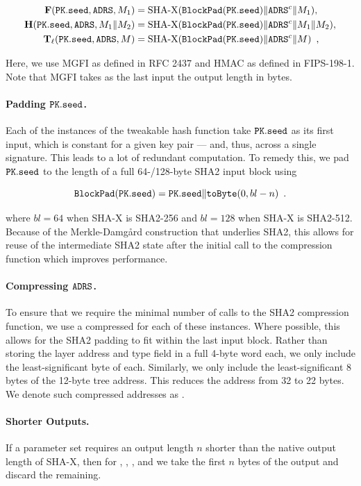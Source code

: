 \begin{align*}
    \hashF(\pk.\seed, \ADRS, M_1) &= \text{SHA-X}(\mathtt{BlockPad}(\pk.\seed) \| \ADRS^c \| M_{1} ), \\
    \hashH(\pk.\seed, \ADRS, M_1 \| M_2) &= \text{SHA-X}(\mathtt{BlockPad}(\pk.\seed) \| \ADRS^c \| M_1 \| M_2 ), \\
    \Th_\ell (\pk.\seed, \ADRS, M) &= \text{SHA-X}(\mathtt{BlockPad}(\pk.\seed) \| \ADRS^c \| M) \enspace,
\end{align*}

Here, we use MGFI as defined in RFC 2437 and HMAC as defined in FIPS-198-1. Note that MGFI takes as the last input the output length in bytes.
 

\paragraph{Padding $\pk.\seed$.} 
Each of the instances of the tweakable hash function take $\pk.\seed$ as its first input, which is constant for a given key pair --- and, thus, across a single signature. This leads to a lot of redundant computation. To remedy this, we pad $\pk.\seed$ to the length of a full 64-/128-byte SHA2 input block using

\[
    \mathtt{BlockPad}(\pk.\seed) =\pk.\seed \| \mathtt{toByte} (0, bl-n) \enspace.
\]

where $bl=64$ when SHA-X is SHA2-256 and $bl=128$ when SHA-X is SHA2-512. Because of the Merkle-Damgård construction that underlies SHA2, this allows for reuse of the intermediate SHA2 state after the initial call to the compression function which improves performance.

\paragraph{Compressing $\mathtt{ADRS}$.} 
To ensure that we require the minimal number of calls to the SHA2 compression function, we use a compressed \ADRS for each of these instances. Where possible, this allows for the SHA2 padding to fit within the last input block. Rather than storing the layer address and type field in a full 4-byte word each, we only include the least-significant byte of each. Similarly, we only include the least-significant 8 bytes of the 12-byte tree address. This reduces the address from 32 to 22 bytes. We denote such compressed addresses as \ADRS.

\paragraph{Shorter Outputs.}
If a parameter set requires an output length $n$ shorter than the native output length of SHA-X, then for \hashF, \hashH, \PRF, and \PRFmsg we take the first $n$ bytes of the output and discard the remaining.


